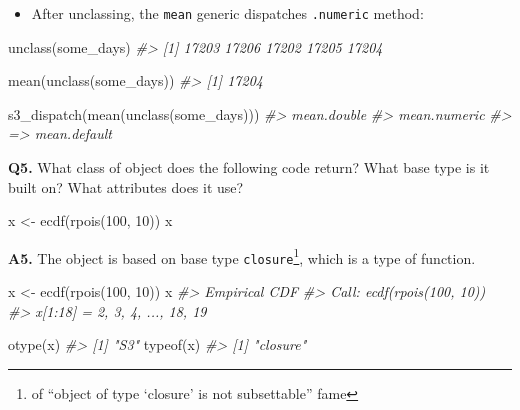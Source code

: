\documentclass[
]{book}
\newenvironment{Shaded}{\begin{snugshade}}{\end{snugshade}}
\newcommand{\CommentTok}[1]{\textcolor[rgb]{0.56,0.35,0.01}{\textit{#1}}}
\newcommand{\DecValTok}[1]{\textcolor[rgb]{0.00,0.00,0.81}{#1}}
\newcommand{\FunctionTok}[1]{\textcolor[rgb]{0.00,0.00,0.00}{#1}}
\newcommand{\NormalTok}[1]{#1}
\newcommand{\OtherTok}[1]{\textcolor[rgb]{0.56,0.35,0.01}{#1}}
\providecommand{\tightlist}{%
  \setlength{\itemsep}{0pt}\setlength{\parskip}{0pt}}
\begin{document}
\begin{itemize}
\tightlist
\item
  After unclassing, the \texttt{mean} generic dispatches \texttt{.numeric} method:
\end{itemize}

\begin{Shaded}
\begin{Highlighting}[]
\FunctionTok{unclass}\NormalTok{(some\_days)}
\CommentTok{\#\textgreater{} [1] 17203 17206 17202 17205 17204}

\FunctionTok{mean}\NormalTok{(}\FunctionTok{unclass}\NormalTok{(some\_days))}
\CommentTok{\#\textgreater{} [1] 17204}

\FunctionTok{s3\_dispatch}\NormalTok{(}\FunctionTok{mean}\NormalTok{(}\FunctionTok{unclass}\NormalTok{(some\_days)))}
\CommentTok{\#\textgreater{}    mean.double}
\CommentTok{\#\textgreater{}    mean.numeric}
\CommentTok{\#\textgreater{} =\textgreater{} mean.default}
\end{Highlighting}
\end{Shaded}

\textbf{Q5.} What class of object does the following code return? What base type is it built on? What attributes does it use?

\begin{Shaded}
\begin{Highlighting}[]
\NormalTok{x }\OtherTok{\textless{}{-}} \FunctionTok{ecdf}\NormalTok{(}\FunctionTok{rpois}\NormalTok{(}\DecValTok{100}\NormalTok{, }\DecValTok{10}\NormalTok{))}
\NormalTok{x}
\end{Highlighting}
\end{Shaded}

\textbf{A5.} The object is based on base type \texttt{closure}\footnote{of ``object of type `closure' is not subsettable'' fame}, which is a type of function.

\begin{Shaded}
\begin{Highlighting}[]
\NormalTok{x }\OtherTok{\textless{}{-}} \FunctionTok{ecdf}\NormalTok{(}\FunctionTok{rpois}\NormalTok{(}\DecValTok{100}\NormalTok{, }\DecValTok{10}\NormalTok{))}
\NormalTok{x}
\CommentTok{\#\textgreater{} Empirical CDF }
\CommentTok{\#\textgreater{} Call: ecdf(rpois(100, 10))}
\CommentTok{\#\textgreater{}  x[1:18] =      2,      3,      4,  ...,     18,     19}

\FunctionTok{otype}\NormalTok{(x)}
\CommentTok{\#\textgreater{} [1] "S3"}
\FunctionTok{typeof}\NormalTok{(x)}
\CommentTok{\#\textgreater{} [1] "closure"}
\end{Highlighting}
\end{Shaded}
\end{document}
